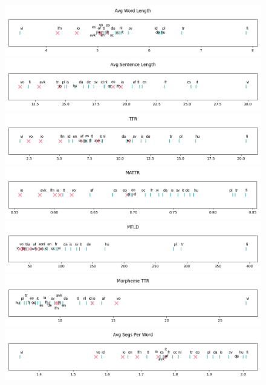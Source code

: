 \documentclass[12pt,a4paper]{article}
\numberwithin{figure}{section}
\numberwithin{table}{section}
\numberwithin{definition}{section}
\begin{document}
\begin{figure}[!ht]
  \centering
  \includegraphics[width=\textwidth]{1d_Avg_Word_Length.png} 
  \includegraphics[width=\textwidth]{1d_Avg_Sentence_Length.png}
  \includegraphics[width=\textwidth]{1d_TTR.png}
  \includegraphics[width=\textwidth]{1d_MATTR.png}
  \includegraphics[width=\textwidth]{1d_MTLD.png}
  \includegraphics[width=\textwidth]{1d_Morpheme_TTR.png}
  \includegraphics[width=\textwidth]{1d_Avg_Segs_Per_Word.png}
\end{figure}
\end{document}
